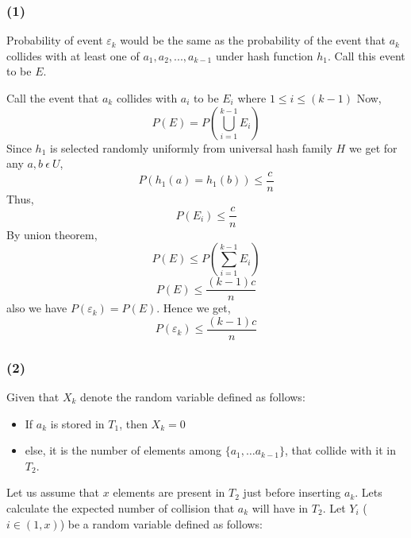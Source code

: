 \documentclass[a4paper]{article}
\begin{document}
\subsubsection*{(1)}
    Probability of event $\varepsilon_k$ would be the same as the probability of the event that $a_k$ collides with at least one of $a_1, a_2, ... , a_{k-1}$ under hash function $h_1$. Call this event to be $E$.
    
    Call the event that $a_k$ collides with $a_i$ to be $E_i$ where $1\leq i\leq (k-1)$
    Now, $$P(E) = P(\bigcup_{i=1}^{k-1} E_i)$$
    Since $h_1$ is selected randomly uniformly from universal hash family $H$ we get for any $a,b\ \epsilon\ U$,
    $$P(h_1(a) = h_1(b)) \leq \frac{c}{n}$$
    Thus,
    $$P(E_i) \leq \frac{c}{n}$$
    By union theorem,
    $$P(E) \leq P(\sum_{i=1}^{k-1} E_i)$$
    $$P(E) \leq \frac{(k-1)c}{n}$$
    also we have $P(\varepsilon_k) = P(E)$.
    Hence we get,
    $$P(\varepsilon_k) \leq \frac{(k-1)c}{n}$$

\subsubsection*{(2)}
Given that $X_k$ denote the random variable defined as follows:
\begin{itemize}
    \item{If $a_k$ is stored in $T_1$, then $X_k = 0$}
    \item{else, it is the number of elements among $\{a_1,\ldots a_{k-1} \}$}, that collide with it in $T_2$.
\end{itemize}
Let us assume that $x$ elements are present in $T_2$ just before inserting $a_k$. Lets calculate the expected number of collision that $a_k$ will have in $T_2$. Let $Y_i$ ($i \in (1,x)$) be a random variable defined as follows:
\end{document}

